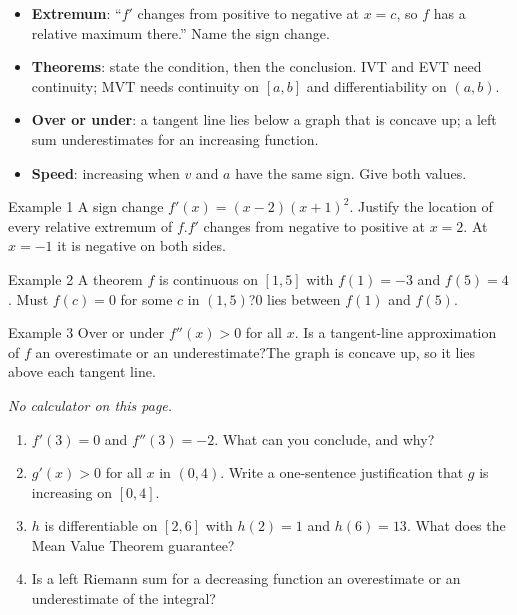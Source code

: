 \documentclass[11pt]{article}
\begin{document}

\begin{ideabox}
\begin{itemize}[leftmargin=*,itemsep=2pt,topsep=2pt]
  \item \textbf{Extremum}: \textquotedblleft{}$f'$ changes from positive to negative at $x=c$, so $f$ has a relative maximum there.\textquotedblright{} Name the sign change.
  \item \textbf{Theorems}: state the condition, then the conclusion. IVT and EVT need continuity; MVT needs continuity on $[a,b]$ and differentiability on $(a,b)$.
  \item \textbf{Over or under}: a tangent line lies below a graph that is concave up; a left sum underestimates for an increasing function.
  \item \textbf{Speed}: increasing when $v$ and $a$ have the same sign. Give both values.
\end{itemize}
\end{ideabox}

\begin{example}{Example 1 \textperiodcentered{} A sign change}
$f'(x)=(x-2)(x+1)^2$. Justify the location of every relative extremum of $f$.\soln $f'$ changes from negative to positive at $x=2$. At $x=-1$ it is negative on both sides.
\end{example}

\begin{example}{Example 2 \textperiodcentered{} A theorem}
$f$ is continuous on $[1,5]$ with $f(1)=-3$ and $f(5)=4$. Must $f(c)=0$ for some $c$ in $(1,5)$?\soln $0$ lies between $f(1)$ and $f(5)$.
\end{example}

\begin{example}{Example 3 \textperiodcentered{} Over or under}
$f''(x)>0$ for all $x$. Is a tangent-line approximation of $f$ an overestimate or an underestimate?\soln The graph is concave up, so it lies above each tangent line.
\end{example}

\newpage
{}
\emph{No calculator on this page.}
\begin{enumerate}[leftmargin=*,itemsep=2pt]
  \item $f'(3)=0$ and $f''(3)=-2$. What can you conclude, and why?\work{2.3cm}
  \item $g'(x)>0$ for all $x$ in $(0,4)$. Write a one-sentence justification that $g$ is increasing on $[0,4]$.\work{2.3cm}
  \item $h$ is differentiable on $[2,6]$ with $h(2)=1$ and $h(6)=13$. What does the Mean Value Theorem guarantee?\work{2.3cm}
  \item Is a left Riemann sum for a decreasing function an overestimate or an underestimate of the integral?\work{2.3cm}
\end{enumerate}
\end{document}
